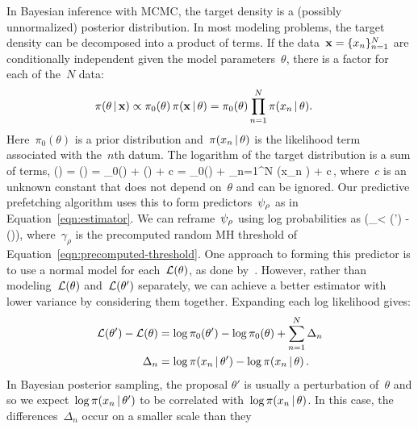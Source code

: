 \documentclass[angelino.tex]{subfiles}
\begin{document}
In Bayesian inference with MCMC, the target density is a
(possibly unnormalized) posterior distribution.
In most modeling problems, %
the target density can be decomposed into a product of terms.
If the data~$\mathbf{x} = \{x_n\}_{n=1}^N$ are conditionally independent given the model
parameters~$\theta$, there is a factor for each of the~$N$ data:
\begin{align}
\pi(\theta \,|\, \mathbf{x}) &\propto \pi_0(\theta) \,\pi(\mathbf{x} \,|\, \theta) 
                 = \pi_0(\theta) \prod_{n=1}^{N} \pi(x_n \,|\, \theta).
\label{eq:poserior}
\end{align}
Here~$\pi_0(\theta)$ is a prior distribution and~$\pi(x_n\,|\,\theta)$
is the likelihood term associated with the~$n$th datum.
The logarithm of the target distribution is a sum of terms,
\be
\mcL(\theta) = \log \pi(\theta \given \x)
= \log \pi_0(\theta) + \log \pi(\x \given \theta) + c
= \log \pi_0(\theta) + \sum_{n=1}^{N} \log \pi(x_n \given \theta) + c\,,
\label{eq:log-posterior}
\ee
where~$c$ is an unknown constant that does not depend on~$\theta$
and can be ignored.
Our predictive prefetching algorithm uses this to form
predictors~$\psi_{\rho}$ as in Equation~\ref{eqn:estimator}.
We can reframe~$\psi_{\rho}$ using log probabilities as
\be
    \Predictor{\rho} \approx \Pr\left(\log \gamma_\rho < \mcL(\theta') - \mcL(\theta)\right),
\ee
where~$\gamma_\rho$ is the precomputed random MH threshold of
Equation~\ref{eqn:precomputed-threshold}.  
One approach to forming this predictor is to use a normal model
for each~$\mathcal{L}(\theta)$, as done by~\citet{korattikara-2014-austerity}.
However, rather than modeling~$\mathcal{L}(\theta)$ and~$\mathcal{L}(\theta')$ separately,
we can achieve a better estimator with lower variance by considering them
together.  Expanding each log likelihood gives:
\begin{align}
\mathcal{L}(\theta') - \mathcal{L}(\theta) &= \log\pi_0(\theta') - \log\pi_0(\theta) + \sum_{n=1}^N\Delta_n\\
\Delta_n &= \log\pi(x_n\,|\,\theta') - \log\pi(x_n\,|\,\theta)\,.
\label{eqn:difference}
\end{align}
In Bayesian posterior sampling, the proposal $\theta'$ is usually a perturbation
of~$\theta$ and so we expect~$\log \pi(x_n\,|\, \theta')$ to be correlated
with~$\log \pi(x_n \,|\, \theta)$.
In this case, the differences~$\Delta_n$ occur on a smaller scale than they
\end{document}
